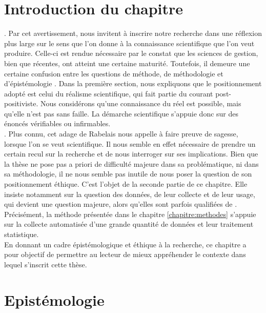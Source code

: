 \section*{Introduction du chapitre}

    . Par cet avertissement, \textcite{avenier2011mixer} nous invitent à inscrire notre recherche dans une réflexion plus large sur le sens que l'on donne à la connaissance scientifique que l'on veut produire. Celle-ci est rendue nécessaire par le constat que les sciences de gestion, bien que récentes, ont atteint une certaine maturité. Toutefois, il demeure une certaine confusion entre les questions de méthode, de méthodologie et d'épistémologie \parencite{martinet2013epistemologie}. Dans la première section, nous expliquons que le positionnement adopté est celui du réalisme scientifique, qui fait partie du courant post-positiviste. Nous considérons qu'une connaissance du réel est possible, mais qu'elle n'est pas sans faille. La démarche scientifique s'appuie donc sur des énoncés vérifiables ou infirmables.  \\
    
    . Plus connu, cet adage de Rabelais nous appelle à faire preuve de sagesse, lorsque l'on se veut scientifique. Il nous semble en effet nécessaire de prendre un certain recul sur la recherche et de nous interroger sur ses implications. Bien que la thèse ne pose pas a priori de difficulté majeure dans sa problématique, ni dans sa méthodologie, il ne nous semble pas inutile de nous poser la question de son positionnement éthique. C'est l'objet de la seconde partie de ce chapitre. Elle insiste notamment sur la question des données, de leur collecte et de leur usage, qui devient une question majeure, alors qu'elles sont parfois qualifiées de . Précisément, la méthode présentée dans le chapitre \ref{chapitre:methodes} s'appuie sur la collecte automatisée d'une grande quantité de données et leur traitement statistique. \\
    
    En donnant un cadre épistémologique et éthique à la recherche, ce chapitre a pour objectif de permettre au lecteur de mieux appréhender le contexte dans lequel s'inscrit cette thèse.

\section{Epistémologie}

